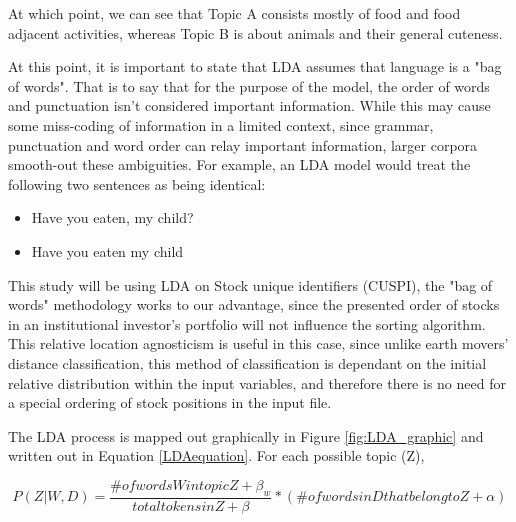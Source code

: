 At which point, we can see that Topic A consists mostly of food and food adjacent activities, whereas Topic B is about animals and their general cuteness. 

At this point, it is important to state that LDA assumes that language is a "bag of words". That is to say that for the purpose of the model, the order of words and punctuation isn't considered important information.  While this may cause some miss-coding of information in a limited context, since grammar, punctuation and word order can relay important information, larger corpora smooth-out these ambiguities. For example, an LDA model would treat the following two sentences as being identical:

\begin{itemize}	
	\item  Have you eaten, my child?
	
	\item  Have you eaten my child\textinterrobang 
\end{itemize}

This study will be using LDA on Stock unique identifiers (CUSPI), the "bag of words" methodology works to our advantage, since the presented order of stocks in an institutional investor's portfolio will not influence the sorting algorithm. This relative location agnosticism is useful in this case, since unlike earth movers' distance classification, this method of classification is dependant on the initial relative distribution within the input variables, and therefore there is no need for a special ordering of stock positions in the input file.  


The LDA process is mapped out graphically in Figure \ref{fig:LDA_graphic} and written out in Equation \ref{LDAequation}. For each possible topic (Z), 






\begin{equation}
P(Z|W,D) = \dfrac{\# of words W in topic Z + \beta_{w}}{total tokens in Z + \beta}*(\# of words in D that belong to Z + \alpha)
\label{LDAequation}
\end{equation}

